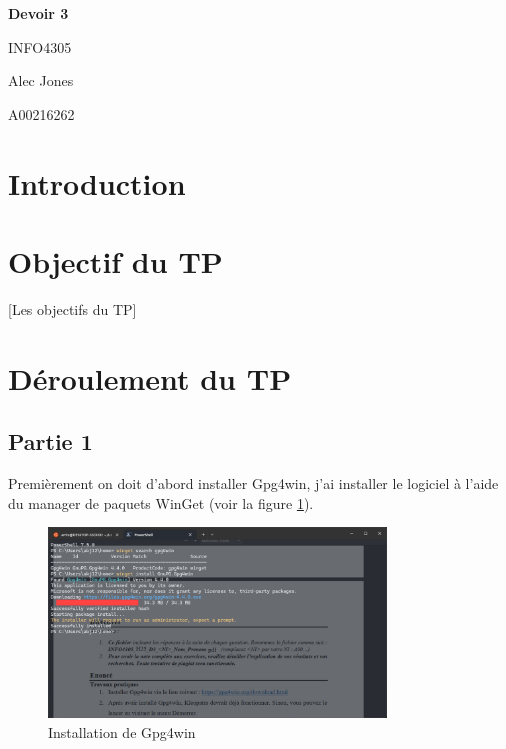 \documentclass[12pt,a4paper]{article}
\begin{document}
\begin{titlepage}
    \begin{center}
        \vspace*{2cm}
        {\huge\bfseries Devoir 3\par}
        {INFO4305\par}
        \vspace{2cm}
        {\Large Alec Jones\par}
        {\large A00216262\par}
        \vfill
    \end{center}
\end{titlepage}

\tableofcontents
\newpage

\section{Introduction}

\section{Objectif du TP}
 [Les objectifs du TP]

\newpage
\section{Déroulement du TP}
\subsection{Partie 1}
Premièrement on doit d'abord installer Gpg4win, j'ai installer le logiciel à
l'aide du manager de paquets WinGet (voir la figure \ref{gpg4win}).

\begin{figure}[h]
    \centering
    \includegraphics[width=0.8\textwidth]{../img/gpg4win.png}
    \caption{Installation de Gpg4win}
    \label{gpg4win}
\end{figure}
\end{document}
